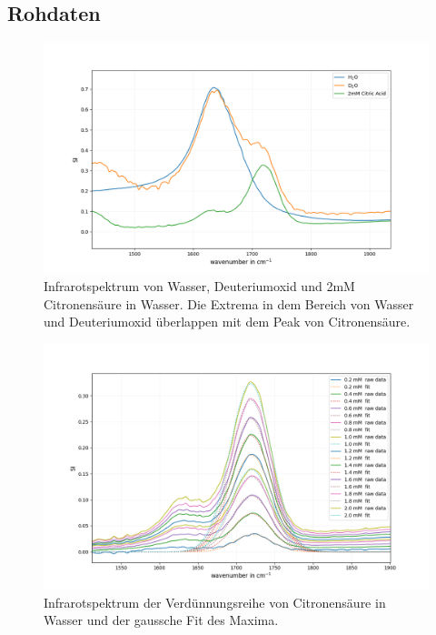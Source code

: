 \documentclass[10pt,a4paper]{article}
\begin{document}
	\subsection{Rohdaten}
		\begin{figure}[H]
			\centering
			\includegraphics[scale=0.65]{water_citricacid_upclose.png}
			\caption{Infrarotspektrum von Wasser, Deuteriumoxid und 2mM Citronensäure in Wasser. Die Extrema in dem Bereich von Wasser und Deuteriumoxid überlappen mit dem Peak von Citronensäure.}
			\label{fig:water_citricacid}
		\end{figure}
		
		
		\begin{figure}[H]
			\centering
			\includegraphics[scale=0.60]{Standardcurve_citricacid_fit.png}
			\caption{Infrarotspektrum der Verdünnungsreihe von Citronensäure in Wasser und der gaussche Fit des Maxima.}
			\label{fig:IR_Standardcurve}
		\end{figure}
	
\end{document}
